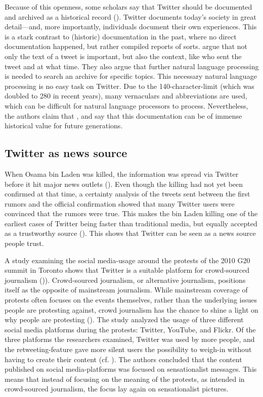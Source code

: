 Because of this openness, some scholars say that Twitter should be documented and archived as a historical record (\cite{risse2014documenting}). Twitter documents today's society in great detail---and, more importantly, individuals document their own experiences. This is a stark contrast to (historic) documentation in the past, where no direct documentation happened, but rather compiled reports of sorts. \citeauthor{risse2014documenting} argue that not only the text of a tweet is important, but also the context, like who sent the tweet and at what time. They also argue that further natural language processing is needed to search an archive for specific topics. This necessary natural language processing is no easy task on Twitter. Due to the 140-character-limit (which was doubled to 280 in recent years), many vernaculars and abbreviations are used, which can be difficult for natural language processors to process. Nevertheless, the authors claim that  \parencite[9]{risse2014documenting}, and say that this documentation can be of immense historical value for future generations.

\subsection{Twitter as news source}  %
When Osama bin Laden was killed, the information was spread via Twitter before it hit major news outlets (\cite{hu2012breaking}). 
Even though the killing had not yet been confirmed at that time, a certainty analysis of the tweets sent between the first rumors and the official confirmation showed that many Twitter users were convinced that the rumors were true. This makes the bin Laden killing one of the earliest cases of Twitter being faster than traditional media, but equally accepted as a trustworthy source (\cite[2751]{hu2012breaking}). This shows that Twitter can be seen as a news source people trust.

A study examining the social media-usage around the protests of the 2010 G20 summit in Toronto shows that Twitter is a suitable platform for crowd-sourced journalism ()\cite{poell2012twitter}). Crowd-sourced journalism, or alternative journalism, positions itself as the opposite of mainstream journalism. While mainstream coverage of protests often focuses on the events themselves, rather than the underlying issues people are protesting against, crowd journalism has the chance to shine a light on why people are protesting (\cite[698]{poell2012twitter}). The study analyzed the usage of three different social media platforms during the protests: Twitter, YouTube, and Flickr. Of the three platforms the researchers examined, Twitter was used by more people, and the retweeting-feature gave more silent users the possibility to weigh-in without having to create their content (cf. \cite[709]{poell2012twitter}). The authors concluded that the content published on social media-platforms was focused on sensationalist messages. This means that instead of focusing on the meaning of the protests, as intended in crowd-sourced journalism, the focus lay again on sensationalist pictures.

